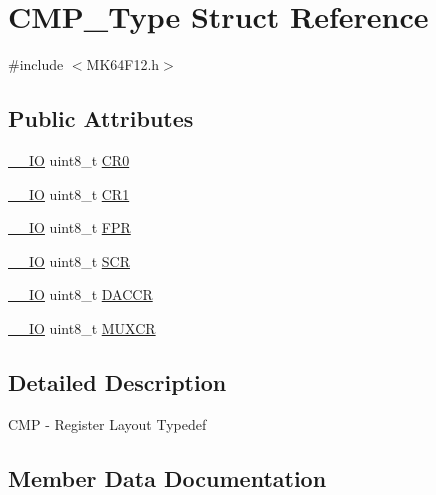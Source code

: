\hypertarget{structCMP__Type}{}\section{C\+M\+P\+\_\+\+Type Struct Reference}
\label{structCMP__Type}


{\ttfamily \#include $<$M\+K64\+F12.\+h$>$}

\subsection*{Public Attributes}
\begin{DoxyCompactItemize}
\item 
\hyperlink{core__sc300_8h_aec43007d9998a0a0e01faede4133d6be}{\+\_\+\+\_\+\+IO} uint8\+\_\+t \hyperlink{structCMP__Type_ad84d485b61d0a301e766a2b58e0c2b39}{C\+R0}
\item 
\hyperlink{core__sc300_8h_aec43007d9998a0a0e01faede4133d6be}{\+\_\+\+\_\+\+IO} uint8\+\_\+t \hyperlink{structCMP__Type_a47763017202bec732ed0b9fe089f0820}{C\+R1}
\item 
\hyperlink{core__sc300_8h_aec43007d9998a0a0e01faede4133d6be}{\+\_\+\+\_\+\+IO} uint8\+\_\+t \hyperlink{structCMP__Type_a47d6d877c8d3ddc7febc7314cf1a0376}{F\+PR}
\item 
\hyperlink{core__sc300_8h_aec43007d9998a0a0e01faede4133d6be}{\+\_\+\+\_\+\+IO} uint8\+\_\+t \hyperlink{structCMP__Type_a5ba1232e4d84912b6f6110d2b3194cb8}{S\+CR}
\item 
\hyperlink{core__sc300_8h_aec43007d9998a0a0e01faede4133d6be}{\+\_\+\+\_\+\+IO} uint8\+\_\+t \hyperlink{structCMP__Type_a13eed556a0b4ba771dbe4cf5ff71d156}{D\+A\+C\+CR}
\item 
\hyperlink{core__sc300_8h_aec43007d9998a0a0e01faede4133d6be}{\+\_\+\+\_\+\+IO} uint8\+\_\+t \hyperlink{structCMP__Type_a6d02ec6f721c03aadaab1c0555cd9fdd}{M\+U\+X\+CR}
\end{DoxyCompactItemize}


\subsection{Detailed Description}
C\+MP -\/ Register Layout Typedef 

\subsection{Member Data Documentation}
